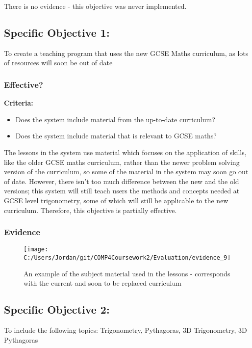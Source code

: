 There is no evidence - this objective was never implemented.

\subsection{Specific Objective 1: }

To create a teaching program that uses the new GCSE Maths curriculum, as lots of resources will soon be out of date

\subsubsection{Effective?}

\textbf{Criteria: }

\begin{itemize}
	\item Does the system include material from the up-to-date curriculum?
	\item Does the system include material that is relevant to GCSE maths?
\end{itemize}

The lessons in the system use material which focuses on the application of skills, like the older GCSE maths curriculum, rather than the newer problem solving version of the curriculum, so some of the material in the system may soon go out of date. However, there isn't too much difference between the new and the old versions; this system will still teach users the methods and concepts needed at GCSE level trigonometry, some of which will still be applicable to the new curriculum. Therefore, this objective is partially effective.

\subsubsection{Evidence}

\begin{figure}[H]
	\texttt{[image: C:/Users/Jordan/git/COMP4Coursework2/Evaluation/evidence\_9]}
	\caption{An example of the subject material used in the lessons - corresponds with the current and soon to be replaced curriculum}
\end{figure}

\subsection{Specific Objective 2: }

To include the following topics: Trigonometry, Pythagoras, 3D Trigonometry, 3D Pythagoras

